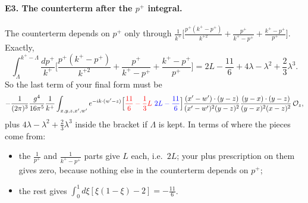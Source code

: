 \documentclass[10pt]{article}
\numberwithin{equation}{section}
\newcommand{\new}[1]{{\color{blue}#1}}
\newcommand{\old}[1]{{\color{red}#1}}
\newcommand{\preE}{\frac{1}{(2\pi)^{3}}\frac{g^{4}}{16\pi^{5}}\frac{1}{k^{+}}}
\newcommand{\Oz}{\mathcal O_z}
\begin{document}
\paragraph{E3. The counterterm after the $p^+$ integral.} The counterterm depends on $p^+$ only through $\frac{1}{k^+}\big[\frac{p^+(k^+-p^+)}{k^{+2}}+\frac{p^+}{k^+-p^+}+\frac{k^+-p^+}{p^+}\big]$. Exactly,
\begin{equation}
\int_\Lambda^{k^+-\Lambda}\frac{dp^+}{k^+}\Big[\frac{p^+(k^+-p^+)}{k^{+2}}+\frac{p^+}{k^+-p^+}+\frac{k^+-p^+}{p^+}\Big]=2L-\frac{11}{6}+4\lambda-\lambda^2+\frac23\lambda^3 .
\end{equation}
So the last term of your final form must be
\begin{equation*}
-\preE\int_{x,y,z,x',w'}e^{-ik\cdot(w'-z)}\Big[\old{\frac{11}{6}-\frac13L}\ \new{2L-\frac{11}{6}}\Big]\frac{(x'-w')\cdot(y-z)}{(x'-w')^{2}(y-z)^{2}}\frac{(y-x)\cdot(y-z)}{(y-x)^{2}(x-z)^{2}}\,\Oz ,
\end{equation*}
plus $4\lambda-\lambda^2+\frac23\lambda^3$ inside the bracket if $\Lambda$ is kept. In terms of where the pieces come from:
\begin{itemize}
\item the $\frac{1}{p^+}$ and $\frac{1}{k^+-p^+}$ parts give $L$ each, i.e.\ $2L$; your plus prescription on them gives zero, because nothing else in the counterterm depends on $p^+$;
\item the rest gives $\int_0^1d\xi[\xi(1-\xi)-2]=-\frac{11}{6}$.
\end{itemize}
\end{document}
